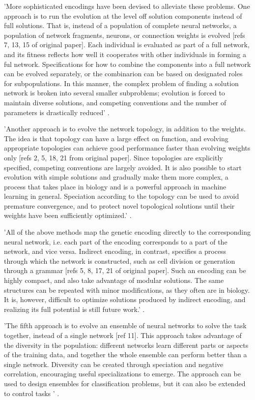'More sophisticated encodings have been devised to alleviate these problems. One approach is to run the evolution at the level off solution components instead of full solutions. That is, instead of a population of complete neural networks, a population of network fragments, neurons, or connection weights is evolved [refs 7, 13, 15 of original paper]. Each individual is evaluated as part of a full network, and its fitness reflects how well it cooperates with other individuals in forming a ful network. Specifications for how to combine the components into a full network can be evolved separately, or the combinarion can be based on designated roles for subpopulations. In this manner, the complex problem of finding a solution network is broken into several smaller subproblems; evolution is forced to maintain diverse solutions, and competing conventions and the number of parameters is drastically reduced' \cite{Miikkulainen2010}.


'Another approach is to evolve the network topology, in addition to the weights. The idea is that topology can have a large effect on function, and evolving appropriate topologies can achieve good performance faster than evolving weights only [refs 2, 5, 18, 21 from original paper]. Since topologies are explicitly specified, competing conventions are largely avoided. It is also possible to start evolution with simple solutions and gradually make them more complex, a process that takes place in biology and is a powerful approach in machine learning in general. Speciation according to the topology can be used to avoid premature convergence, and to protect novel topological solutions until their weights have been sufficiently optimized.' \cite{Miikkulainen2010}.

'All of the above methods map the genetic encoding directly to the corresponding neural network, i.e. each part of the encoding corresponds to a part of the network, and vice versa. Indirect encoding, in contrast, specifies a process through which the network is constructed, such as cell division or generation through a grammar [refs 5, 8, 17, 21 of original paper]. Such an encoding can be highly compact, and also take advantage of modular solutions. The same structures can be repeated with minor modifications, as they often are in biology. It is, however, difficult to optimize solutions produced by indirect encoding, and realizing its full potential is still future work.' \cite{Miikkulainen2010}.

'The fifth approach is to evolve an ensemble of neural networks to solve the task together, instead of a single network [ref 11]. This approach takes advantage of the diversity in the population: different networks learn different parts or aspects of the training data, and together the whole ensemble can perform better than a single network. Diversity can be created through speciation and negative correlation, encouraging useful specializations to emerge. The approach can be used to design ensembles for classification problems, but it can also be extended to control tasks ' \cite{Miikkulainen2010}.

